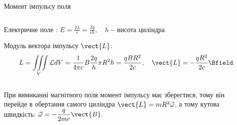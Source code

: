 \documentclass[onlytextwidth]{beamer}
\begin{document}
\begin{frame}{Момент імпульсу поля}{}
\begin{columns}
\begin{column}{0.75\linewidth}
\begin{block}{}
				Електричне поле :
				\(\displaystyle
				E = \frac{2\lambda}{r} = \frac{2q}{rh}, \quad h - \text{висота циліндра}
				\)

				Модуль вектора імпульсу $ \vect{L} $:
				\begin{equation*}
					L = \iiint\limits_V\mathcal{L} dV = \frac{1}{4\pi c} B \frac{2q}{h} \pi R^2 h = \frac{qBR^2}{2c}, \quad \vect{L} = - \frac{qR^2}{2c}
					\Bfield
				\end{equation*}
			\end{block}
		\end{column}
	\end{columns}
	\begin{block}{}\justifying
		При вимиканні магнітного поля момент імпульсу має зберегтися, тому він перейде в обертання самого циліндра $ \vect{L} = mR^2\vec\omega
		$, а тому кутова швидкість:
		\(
		\displaystyle	\vec{\omega} = -\frac{q}{2mc}\vect{B}.
		\)
	\end{block}
\end{frame}
\end{document}
